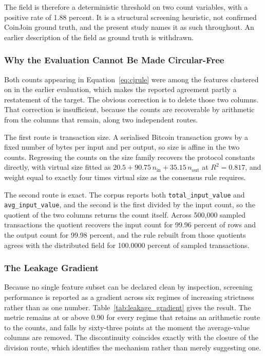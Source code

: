\documentclass[12pt,a4paper]{article}
\begin{document}
The field is therefore a deterministic threshold on two count
variables, with a positive rate of 1.88 percent. It is a
structural screening heuristic, not confirmed CoinJoin ground
truth, and the present study names it as such throughout. An
earlier description of the field as ground truth is withdrawn.

\subsubsection{Why the Evaluation Cannot Be Made Circular-Free}

Both counts appearing in Equation~\eqref{eq:cjrule} were among
the features clustered on in the earlier evaluation, which makes
the reported agreement partly a restatement of the target. The
obvious correction is to delete those two columns. That
correction is insufficient, because the counts are recoverable by
arithmetic from the columns that remain, along two independent
routes.

The first route is transaction size. A serialised Bitcoin
transaction grows by a fixed number of bytes per input and per
output, so size is affine in the two counts. Regressing the
counts on the size family recovers the protocol constants
directly, with virtual size fitted as
$20.5 + 90.75\,n_{\text{in}} + 35.15\,n_{\text{out}}$ at
$R^2 = 0.817$, and weight equal to exactly four times virtual
size as the consensus rule requires.

The second route is exact. The corpus reports both
\texttt{total\_input\_value} and \texttt{avg\_input\_value}, and
the second is the first divided by the input count, so the
quotient of the two columns returns the count itself. Across
500{,}000 sampled transactions the quotient recovers the input
count for 99.96 percent of rows and the output count for 99.98
percent, and the rule rebuilt from those quotients agrees with
the distributed field for 100.0000 percent of sampled
transactions.

\subsubsection{The Leakage Gradient}

Because no single feature subset can be declared clean by
inspection, screening performance is reported as a gradient
across six regimes of increasing strictness rather than as one
number. Table~\ref{tab:leakage_gradient} gives the result. The
metric remains at or above 0.90 for every regime that retains an
arithmetic route to the counts, and falls by sixty-three points
at the moment the average-value columns are removed. The
discontinuity coincides exactly with the closure of the division
route, which identifies the mechanism rather than merely
suggesting one.
\end{document}
